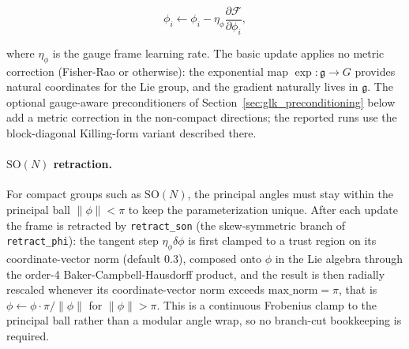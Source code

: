 \documentclass[twoside,11pt]{article}
\begin{document}
\begin{equation}
\phi_i \leftarrow \phi_i - \eta_\phi \frac{\partial \mathcal{F}}{\partial \phi_i},
\label{eq:phi_update}
\end{equation}

where $\eta_\phi$ is the gauge frame learning rate. The basic update applies no metric correction (Fisher-Rao or otherwise): the exponential map $\exp: \mathfrak{g} \to G$ provides natural coordinates for the Lie group, and the gradient naturally lives in $\mathfrak{g}$. The optional gauge-aware preconditioners of Section~\ref{sec:glk_preconditioning} below add a metric correction in the non-compact directions; the reported runs use the block-diagonal Killing-form variant described there.

\paragraph{$\mathrm{SO}(N)$ retraction.} For compact groups such as $\mathrm{SO}(N)$, the principal angles must stay within the principal ball $\|\phi\| < \pi$ to keep the parameterization unique. After each update the frame is retracted by \texttt{retract\_son} (the skew-symmetric branch of \texttt{retract\_phi}): the tangent step $\eta_\phi \delta\phi$ is first clamped to a trust region on its coordinate-vector norm (default $0.3$), composed onto $\phi$ in the Lie algebra through the order-4 Baker-Campbell-Hausdorff product, and the result is then radially rescaled whenever its coordinate-vector norm exceeds $\mathrm{max\_norm} = \pi$, that is $\phi \leftarrow \phi \cdot \pi/\|\phi\|$ for $\|\phi\| > \pi$. This is a continuous Frobenius clamp to the principal ball rather than a modular angle wrap, so no branch-cut bookkeeping is required.
\end{document}
